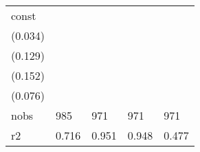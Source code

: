 \begin{tabular}{lllll}
const                     &   \makecell{$0.129^{***}$ \\ (0.034)} &     \makecell{$0.009^{}$ \\ (0.129)} &     \makecell{$0.028^{}$ \\ (0.152)} &    \makecell{$0.240^{***}$ \\ (0.076)} \\
\midrule nobs             &                                   985 &                                  971 &                                  971 &                                    971 \\
r2                        &                                 0.716 &                                0.951 &                                0.948 &                                  0.477 \\
\bottomrule
\end{tabular}
